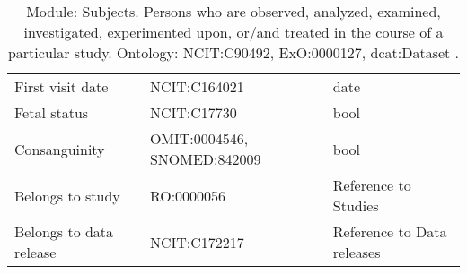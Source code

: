 \documentclass{article}
\begin{document}
\begin{table}[htb]
\begin{tabular}{lll}
First visit date & NCIT:C164021  & date \\
Fetal status & NCIT:C17730  & bool \\
Consanguinity & OMIT:0004546, SNOMED:842009  & bool \\
Belongs to study & RO:0000056  & Reference to Studies \\
Belongs to data release & NCIT:C172217  & Reference to Data releases \\
\hline
\end{tabular}
\caption[Module: Subjects]{\label{table:table4} Module: Subjects. Persons who are observed, analyzed, examined, investigated, experimented upon, or/and treated in the course of a particular study. Ontology: NCIT:C90492, ExO:0000127, dcat:Dataset . }
\end{table}
\end{document}
